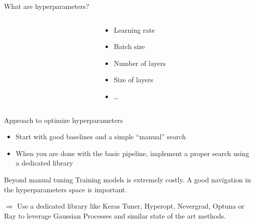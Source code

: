 \begin{frame}{What are hyperparameters?}
  \begin{columns}
    \begin{column}[c]{0.5\textwidth}
    \end{column}
    \begin{column}[c]{0.5\textwidth}
      \begin{itemize}
        \item Learning rate
        \item Batch size
        \item Number of layers
        \item Size of layers
        \item …
      \end{itemize}
    \end{column}
  \end{columns}
\end{frame}

\begin{frame}{Approach to optimize hyperparameters}
  \begin{itemize}
    \item Start with good baselines and a simple “manual” search
    \item When you are done with the basic pipeline, implement a proper search using a dedicated library
  \end{itemize}
\end{frame}

\begin{frame}{Beyond manual tuning}
  Training models is extremely costly.
  A good navigation in the hyperparameters space is important.

  $\Rightarrow$ Use a dedicated library like Keras Tuner, Hyperopt, Nevergrad, Optuna or Ray to leverage Gaussian Processes and similar state of the art methods.
\end{frame}
